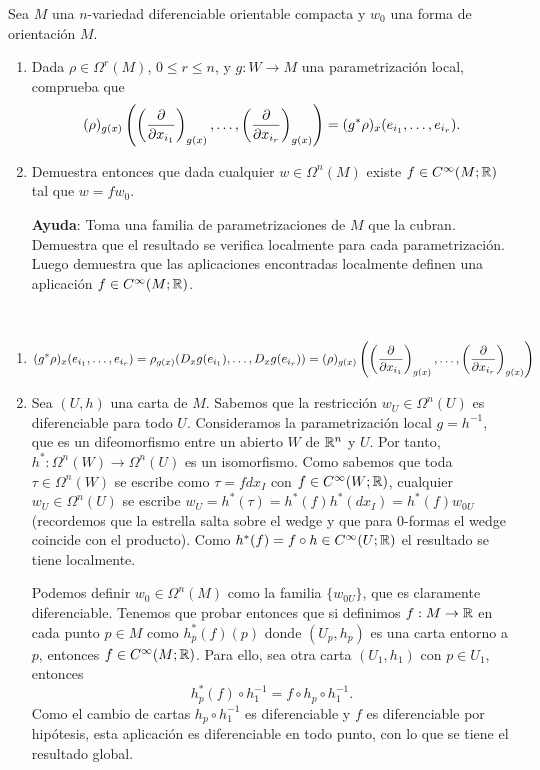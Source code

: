 \documentclass[twoside]{article}
\begin{document}
\begin{ejercicio}{3}
Sea $M$ una $n$-variedad diferenciable orientable compacta y $w_0$ una forma de orientación $M$.
\begin{enumerate}
\item Dada $\rho\in\Omega^r(M)$, $0\leq r\leq n$, y $g:W\to M$ una parametrización local, comprueba que
\[
(\rho)_{g(x)}\left(\left(\frac{\partial }{\partial x_{i_1}}\right)_{g(x)},\dots, \left(\frac{\partial }{\partial x_{i_r}}\right)_{g(x)}\right)=(g^*\rho)_x(e_{i_1},\dots, e_{i_r}).
\]
\item Demuestra entonces que dada cualquier $w\in\Omega^n(M)$ existe $f\in C^{\infty}(M;\mathbb{R})$ tal que $w=fw_0$.

\textbf{Ayuda}: Toma una familia de parametrizaciones de $M$ que la cubran. Demuestra que el resultado se verifica localmente para cada parametrización. Luego demuestra que las aplicaciones encontradas localmente definen una aplicación $f\in C^{\infty}(M;\mathbb{R})$.
\end{enumerate}
\end{ejercicio}
\begin{solucion}\
\begin{enumerate}
\item 
\[
(g^*\rho)_x(e_{i_1},\dots, e_{i_r})=\rho_{g(x)}(D_xg(e_{i_1}),\dots, D_xg(e_{i_r}))=(\rho)_{g(x)}\left(\left(\frac{\partial }{\partial x_{i_1}}\right)_{g(x)},\dots, \left(\frac{\partial }{\partial x_{i_r}}\right)_{g(x)}\right)
\]
\item Sea $(U,h)$ una carta de $M$. Sabemos que la restricción $w_U\in\Omega^n(U)$ es diferenciable para todo $U$. Consideramos la parametrización local $g=h^{-1}$, que es un difeomorfismo entre un abierto $W$ de $\mathbb{R}^n$ y $U$. Por tanto, $h^*:\Omega^n(W)\to\Omega^n(U)$ es un isomorfismo. Como sabemos que toda $\tau\in\Omega^n(W)$ se escribe como $\tau=f dx_I$ con $f\in C^{\infty}(W;\mathbb{R})$, cualquier $w_U\in\Omega^n(U)$ se escribe $w_U=h^*(\tau)=h^*(f)h^*(dx_I)=h^*(f)w_{0U}$ (recordemos que la estrella salta sobre el wedge y que para 0-formas el wedge coincide con el producto). Como $h^*(f)=f\circ h\in C^{\infty}(U;\mathbb{R})$ el resultado se tiene localmente. 

Podemos definir $w_0\in\Omega^n(M)$ como la familia $\{w_{0U}\}$, que es claramente diferenciable. Tenemos que probar entonces que si definimos $f:M\to \mathbb{R}$ en cada punto $p\in M$ como $h_p^*(f)(p)$ donde $(U_p,h_p)$ es una carta entorno a $p$, entonces $f\in C^{\infty}(M;\mathbb{R})$. Para ello, sea otra carta $(U_1,h_1)$ con $p\in U_1$, entonces
\[
h_p^*(f)\circ h_1^{-1}=f\circ h_p\circ h_1^{-1}.
\]
Como el cambio de cartas $h_p\circ h^{-1}_1$ es diferenciable y $f$ es diferenciable por hipótesis, esta aplicación es diferenciable en todo punto, con lo que se tiene el resultado global.
\end{enumerate}

\end{solucion}
\newpage
\end{document}
